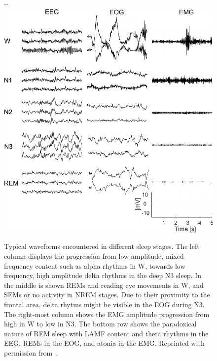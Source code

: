             \begin{figure}[htp]
            \begin{adjustwidth*}{}{-\marginparwidth-\marginparsep}
                \centering
                \includegraphics[width=\linewidth]{figures/clinical-background/TypicalWaves.pdf}
                \caption[Signal content in different sleep stages]{Typical waveforms encountered in different sleep stages. The left column displays the progression from low amplitude, mixed frequency content such as alpha rhythms in \acs{W}, towards low frequency, high amplitude delta rhythms in the deep \acs{N3} sleep. In the middle is shown \acsp{REM} and reading eye movements in \acs{W}, and \acsp{SEM} or no activity in \acs{NREM} stages. Due to their proximity to the frontal area, delta rhytms might be visible in the \acs{EOG} during \acs{N3}. The right-most column shows the \acs{EMG} amplitude progression from high in \acs{W} to low in \acs{N3}. The bottom row shows the paradoxical nature of \acs{REM} sleep with \acs{LAMF} content and theta rhythms in the \acs{EEG}, \acsp{REM}  in the \acs{EOG}, and atonia in the \acs{EMG}. Reprinted with permission from~\cite{Cesari2019}.}
                \label{fig:clinical-background:stage-specifics}
            \end{adjustwidth*}
            \end{figure}
            
